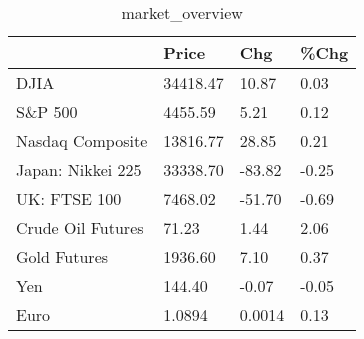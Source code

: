 \documentclass{article}%
\begin{document}
%


\begin{table}[htbp]%
\caption{market\_overview}%
\centering%
\begin{adjustbox}{width=1\textwidth}%
\begin{tabular}{llll}
\toprule
                  &    Price &    Chg &  \%Chg \\
\midrule
             DJIA & 34418.47 &  10.87 &  0.03 \\
          S\&P 500 &  4455.59 &   5.21 &  0.12 \\
 Nasdaq Composite & 13816.77 &  28.85 &  0.21 \\
Japan: Nikkei 225 & 33338.70 & -83.82 & -0.25 \\
     UK: FTSE 100 &  7468.02 & -51.70 & -0.69 \\
Crude Oil Futures &    71.23 &   1.44 &  2.06 \\
     Gold Futures &  1936.60 &   7.10 &  0.37 \\
              Yen &   144.40 &  -0.07 & -0.05 \\
             Euro &   1.0894 & 0.0014 &  0.13 \\
\bottomrule
\end{tabular}
%
\end{adjustbox}%
\end{table}

%
\end{document}

